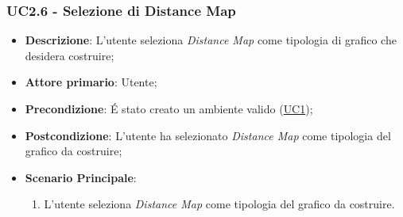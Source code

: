 \subsubsection{UC2.6 - Selezione di Distance Map}
\label{ssub:uc2.6}
\begin{itemize}
	\item \textbf{Descrizione}: L’utente seleziona \emph{Distance Map} come tipologia di grafico che desidera 
	costruire;
	\item \textbf{Attore primario}:	Utente;
	\item \textbf{Precondizione}:	É stato creato un ambiente valido (\hyperref[sub:uc1]{UC1});

    \item \textbf{Postcondizione}:  L'utente ha selezionato \emph{Distance Map} come tipologia del grafico da 
	costruire;

	\item \textbf{Scenario Principale}: 
	\begin{enumerate}
		\item L'utente seleziona \emph{Distance Map} come tipologia del grafico da costruire.
	\end{enumerate}
\end{itemize}